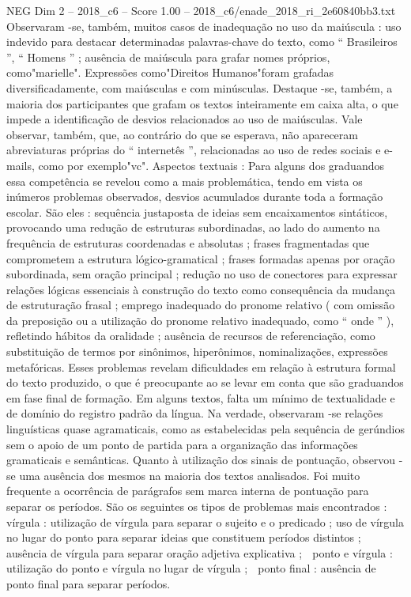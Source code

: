 \begin{textsample}{NEG Dim 2 – 2018\_c6 – Score 1.00 – 2018\_c6/enade\_2018\_ri\_2e60840bb3.txt}
Observaram -se, também, muitos casos de inadequação no uso da maiúscula : uso indevido para destacar determinadas palavras-chave do texto, como “ Brasileiros ”, “ Homens ” ; ausência de maiúscula para grafar nomes próprios, como"marielle".
Expressões como"Direitos Humanos"foram grafadas diversificadamente, com maiúsculas e com minúsculas.
Destaque -se, também, a maioria dos participantes que grafam os textos inteiramente em caixa alta, o que impede a identificação de desvios relacionados ao uso de maiúsculas.
Vale observar, também, que, ao contrário do que se esperava, não apareceram abreviaturas próprias do “ internetês ”, relacionadas ao uso de redes sociais e e-mails, como por exemplo"vc".
Aspectos textuais : Para alguns dos graduandos essa competência se revelou como a mais problemática, tendo em vista os inúmeros problemas observados, desvios acumulados durante toda a formação escolar.
São eles : sequência justaposta de ideias sem encaixamentos sintáticos, provocando uma redução de estruturas subordinadas, ao lado do aumento na frequência de estruturas coordenadas e absolutas ; frases fragmentadas que comprometem a estrutura lógico-gramatical ; frases formadas apenas por oração subordinada, sem oração principal ; redução no uso de conectores para expressar relações lógicas essenciais à construção do texto como consequência da mudança de estruturação frasal ; emprego inadequado do pronome relativo ( com omissão da preposição ou a utilização do pronome relativo inadequado, como “ onde ” ), refletindo hábitos da oralidade ; ausência de recursos de referenciação, como substituição de termos por sinônimos, hiperônimos, nominalizações, expressões metafóricas.
Esses problemas revelam dificuldades em relação à estrutura formal do texto produzido, o que é preocupante ao se levar em conta que são graduandos em fase final de formação.
Em alguns textos, falta um mínimo de textualidade e de domínio do registro padrão da língua.
Na verdade, observaram -se relações linguísticas quase agramaticais, como as estabelecidas pela sequência de gerúndios sem o apoio de um ponto de partida para a organização das informações gramaticais e semânticas.
Quanto à utilização dos sinais de pontuação, observou -se uma ausência dos mesmos na maioria dos textos analisados.
Foi muito frequente a ocorrência de parágrafos sem marca interna de pontuação para separar os períodos.
São os seguintes os tipos de problemas mais encontrados :  vírgula : utilização de vírgula para separar o sujeito e o predicado ; uso de vírgula no lugar do ponto para separar ideias que constituem períodos distintos ; ausência de vírgula para separar oração adjetiva explicativa ;  ponto e vírgula : utilização do ponto e vírgula no lugar de vírgula ;  ponto final : ausência de ponto final para separar períodos.

\end{textsample}
